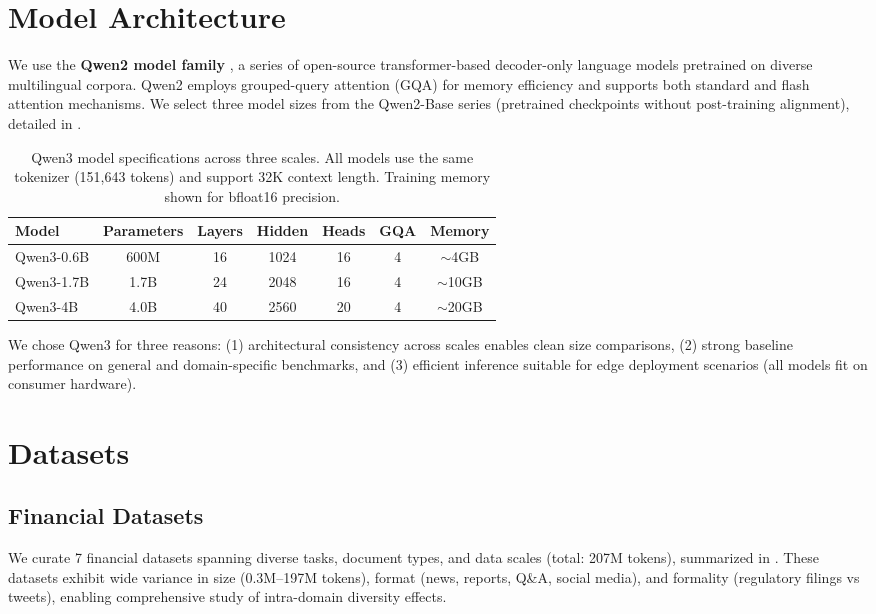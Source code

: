 \section{Model Architecture}

We use the \textbf{Qwen2 model family} \parencite{yang2024qwen2}, a series of open-source transformer-based decoder-only language models pretrained on diverse multilingual corpora. Qwen2 employs grouped-query attention (GQA) for memory efficiency and supports both standard and flash attention mechanisms. We select three model sizes from the Qwen2-Base series (pretrained checkpoints without post-training alignment), detailed in .

\begin{table}[h]
\centering
\caption{Qwen3 model specifications across three scales. All models use the same tokenizer (151,643 tokens) and support 32K context length. Training memory shown for bfloat16 precision.}
\label{tab:model_specs}
\begin{tabular}{lcccccc}
\toprule
\textbf{Model} & \textbf{Parameters} & \textbf{Layers} & \textbf{Hidden} & \textbf{Heads} & \textbf{GQA} & \textbf{Memory} \\
\midrule
Qwen3-0.6B & 600M & 16 & 1024 & 16 & 4 & $\sim$4GB \\
Qwen3-1.7B & 1.7B & 24 & 2048 & 16 & 4 & $\sim$10GB \\
Qwen3-4B & 4.0B & 40 & 2560 & 20 & 4 & $\sim$20GB \\
\bottomrule
\end{tabular}
\end{table}

We chose Qwen3 for three reasons: (1) architectural consistency across scales enables clean size comparisons, (2) strong baseline performance on general and domain-specific benchmarks, and (3) efficient inference suitable for edge deployment scenarios (all models fit on consumer hardware).

\section{Datasets}

\subsection{Financial Datasets}

We curate 7 financial datasets spanning diverse tasks, document types, and data scales (total: 207M tokens), summarized in . These datasets exhibit wide variance in size (0.3M--197M tokens), format (news, reports, Q\&A, social media), and formality (regulatory filings vs tweets), enabling comprehensive study of intra-domain diversity effects.

